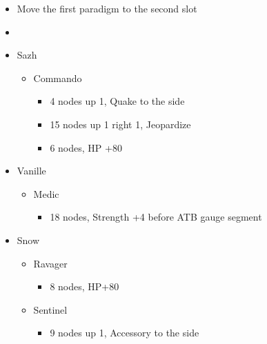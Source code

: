 \begin{menu}
\begin{multicols}{2}
\begin{itemize}
    \paradigm
    \begin{itemize}
        \item Move the first paradigm to the second slot
        \item {}%
{\paradigmline{(\syn)}{\sab}{\rav}}%
{\paradigmline{\com}{\med}{\com}}%
{\paradigmline{\syn}{\med}{\com}}%
{\paradigmline{\com}{\sab}{\com}}%
{\paradigmline[5]{\textit{\syn}}{\textit{\sab}}{\textit{\com}}}%
{\paradigmline{\com}{\rav}{\com}}
    \end{itemize}
    \crystarium
    \begin{itemize}
        \item Sazh
        \begin{itemize}
            \item Commando
            \begin{itemize}
                \item 4 nodes up 1, Quake to the side
                \item 15 nodes up 1 right 1, Jeopardize
                \item 6 nodes, HP +80
            \end{itemize}
        \end{itemize}
        \item Vanille
        \begin{itemize}
            \item Medic
            \begin{itemize}
                \item 18 nodes, Strength +4 before ATB gauge segment
            \end{itemize}
        \end{itemize}
        \item Snow
        \begin{itemize}
            \item Ravager
            \begin{itemize}
                \item 8 nodes, HP+80
            \end{itemize}
            \item Sentinel
            \begin{itemize}
                \item 9 nodes up 1, Accessory to the side

\end{itemize}
\end{itemize}
\end{itemize}
\end{itemize}
\end{multicols}
\end{menu}
